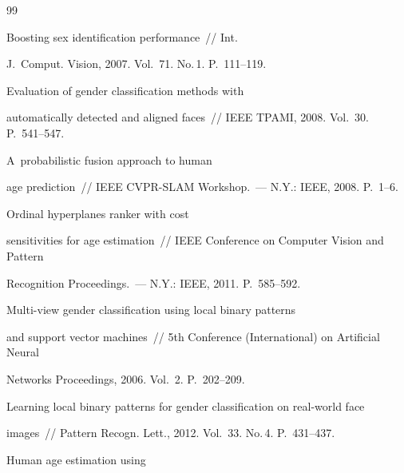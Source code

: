 {{\begin{thebibliography}{99}


 Boosting sex identification performance~/\!\!/ Int. 


J.~Comput. Vision, 2007. Vol.~71. No.\,1. P.~111--119.







 Evaluation of gender classification methods with 


automatically detected and aligned faces~/\!\!/ IEEE TPAMI, 2008. Vol.~30. P.~541--547.







 A~probabilistic fusion approach to human 


age prediction~/\!\!/ IEEE CVPR-SLAM Workshop.~--- N.Y.: IEEE, 2008. P.~1--6.







 Ordinal hyperplanes ranker with cost 


sensitivities for age estimation~/\!\!/ IEEE Conference on Computer Vision and Pattern 


Recognition Proceedings.~--- N.Y.: IEEE, 2011. P.~585--592.







 Multi-view gender classification using local binary patterns 


and support vector machines~/\!\!/ 5th Conference (International) on Artificial Neural 


Networks Proceedings, 2006. Vol.~2. P.~202--209.







 Learning local binary patterns for gender classification on real-world face 


images~/\!\!/ Pattern Recogn. Lett., 2012. Vol.~33. No.\,4. P.~431--437. 







 Human age estimation using 



\end{thebibliography}}}
